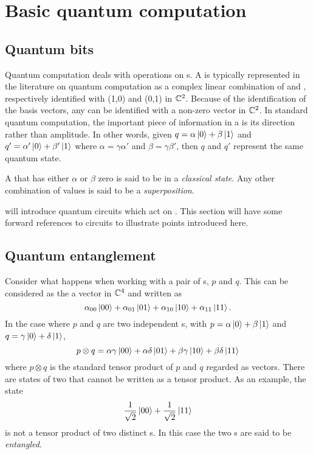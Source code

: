 \section{Basic quantum computation}\label{sec:appBasicsOfQC}
\subsection{Quantum bits}\label{sec:appQuantumBits}
Quantum computation deals with operations on \qbit{}s. A \qbit{} is typically
represented in the literature on quantum computation as a complex
linear combination of  and , respectively
identified with (1,0) and (0,1) in $\mathbb{C}^2$. Because of the 
identification of the basis vectors, any \qbit{} can be identified
with a non-zero vector in $\mathbb{C}^2$.
In standard quantum computation, the important piece of
 information in a \qbit{} is its direction rather than
amplitude. In other words, given $q=\alpha\left\vert{0}\right\rangle+\beta\left\vert{1}\right\rangle$ and
$q'=\alpha'\left\vert{0}\right\rangle+\beta'\left\vert{1}\right\rangle$ 
where $\alpha = \gamma\alpha'$ and
$\beta = \gamma\beta'$, then $q$ and $q'$ represent the same
quantum state. 



A \qbit{} that has either $\alpha$ or $\beta$ zero is said to be in
a \emph{classical state}. Any other combination of values is said to be a 
\emph{superposition}.

 will introduce quantum circuits 
which act on \qbits{}. This section will have some forward 
references to circuits to illustrate points introduced here.

\subsection{Quantum entanglement}\label{sec:appQuantumEntanglement}
Consider what happens when working with a pair of \qbit{}s, $p$ and $q$. 
This can be considered as the a vector in $\mathbb{C}^4$ and written as
\begin{equation}
\alpha_{00}\left\vert{00}\right\rangle+\alpha_{01}\left\vert{01}\right\rangle+\alpha_{10}\left\vert{10}\right\rangle+
\alpha_{11}\left\vert{11}\right\rangle.\label{eq:appTwoQbits}
\end{equation}
In the case where $p$ and $q$ 
are two independent \qbit{}s, with $p=\alpha\left\vert{0}\right\rangle+\beta\left\vert{1}\right\rangle$
and $q=\gamma\left\vert{0}\right\rangle+\delta\left\vert{1}\right\rangle$,
\begin{equation}
p \otimes q = \alpha\gamma\left\vert{00}\right\rangle+\alpha\delta\left\vert{01}\right\rangle+\beta\gamma\left\vert{10}\right\rangle+
\beta\delta\left\vert{11}\right\rangle
\end{equation}
where $p \otimes q$  is the standard tensor product of 
$p$ and $q$ regarded as vectors. There are states of two \qbits{} 
that cannot be written as a tensor product. As an example, the state 
\begin{equation}
\frac{1}{\sqrt{2}}\left\vert{00}\right\rangle +
\frac{1}{\sqrt{2}}\left\vert{11}\right\rangle\label{eq:appEntangledqbits}
\end{equation} 
is not  a tensor product of two distinct \qbit{}s. 
In this case the two \qbit{}s are said to be \emph{entangled}. 


